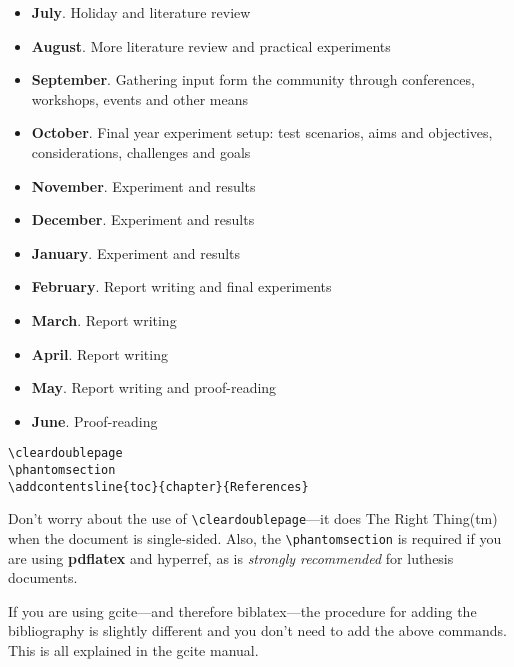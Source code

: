 \documentclass[iwp,first]{luthesis}
\begin{document}
\begin{itemize}

	\item {\bf July}. Holiday and literature review

	\item {\bf August}. More literature review and practical experiments
 
	\item {\bf September}. Gathering input form the community through conferences, workshops, events and other means

	\item {\bf October}. Final year experiment setup: test scenarios, aims and objectives, considerations, challenges and goals

	\item {\bf November}. Experiment and results

	\item {\bf December}. Experiment and results

	\item {\bf January}. Experiment and results

	\item {\bf February}. Report writing and final experiments

	\item {\bf March}. Report writing

	\item {\bf April}. Report writing

	\item {\bf May}. Report writing and proof-reading

	\item {\bf June}. Proof-reading

\end{itemize}


\begin{verbatim}
\cleardoublepage
\phantomsection
\addcontentsline{toc}{chapter}{References}
\end{verbatim}

Don't worry about the use of \verb|\cleardoublepage|---it does The Right Thing(tm) when the document is single-sided.  Also, the \verb|\phantomsection| is required if you are using \textbf{pdflatex} and \textsf{hyperref}, as is \emph{strongly recommended} for \textsf{luthesis} documents.

If you are using \textsf{gcite}---and therefore \textsf{biblatex}---the procedure for adding the bibliography is slightly different and you don't need to add the above commands.  This is all explained in the \textsf{gcite} manual.
\end{document}
